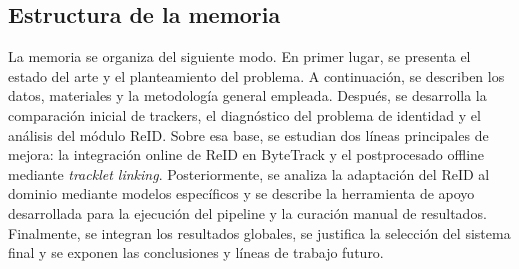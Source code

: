 \documentclass[../MAIN.tex]{subfiles}
\begin{document}
\subsection{Estructura de la memoria}

La memoria se organiza del siguiente modo. En primer lugar, se presenta el estado del arte y el planteamiento del problema. A continuación, se describen los datos, materiales y la metodología general empleada. Después, se desarrolla la comparación inicial de trackers, el diagnóstico del problema de identidad y el análisis del módulo ReID. Sobre esa base, se estudian dos líneas principales de mejora: la integración online de ReID en ByteTrack y el postprocesado offline mediante \textit{tracklet linking}. Posteriormente, se analiza la adaptación del ReID al dominio mediante modelos específicos y se describe la herramienta de apoyo desarrollada para la ejecución del pipeline y la curación manual de resultados. Finalmente, se integran los resultados globales, se justifica la selección del sistema final y se exponen las conclusiones y líneas de trabajo futuro.

\newpage
\end{document}
